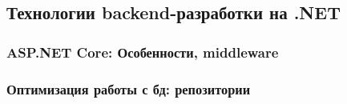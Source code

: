 \subsection{Технологии backend-разработки на .NET}

\subsubsection{ASP.NET Core: Особенности, middleware}

\subsubsection{Оптимизация работы с бд: репозитории}
